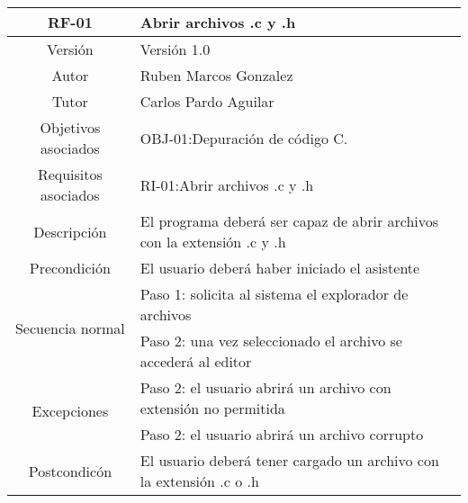 \begin{table}[h!]
\centering
\begin{tabular}[c]{|c|m{10cm}|}
\hline
RF-01 & Abrir archivos .c y .h \\
\hline
\hline
Versión & Versión 1.0 \\
\hline
Autor & Ruben Marcos Gonzalez \\
\hline
Tutor & Carlos Pardo Aguilar \\
\hline
Objetivos asociados & OBJ-01:Depuración de código C. \\
\hline
Requisitos asociados & RI-01:Abrir archivos .c y .h \\
\hline
Descripción & El programa deberá ser capaz de abrir archivos con la extensión .c y .h \\
\hline
Precondición & El usuario deberá haber iniciado el asistente \\
\hline
\multirow{2}{*}{Secuencia normal} & Paso 1: solicita al sistema el explorador de archivos \\
\hline
& Paso 2: una vez seleccionado el archivo se accederá al editor \\
\hline
\multirow{2}{*}{Excepciones} & Paso 2: el usuario abrirá un archivo con extensión no permitida \\
\hline
& Paso 2: el usuario abrirá un archivo corrupto \\
\hline
Postcondicón & El usuario deberá tener cargado un archivo con la extensión .c o .h \\
\hline
\end{tabular}
\end{table}

